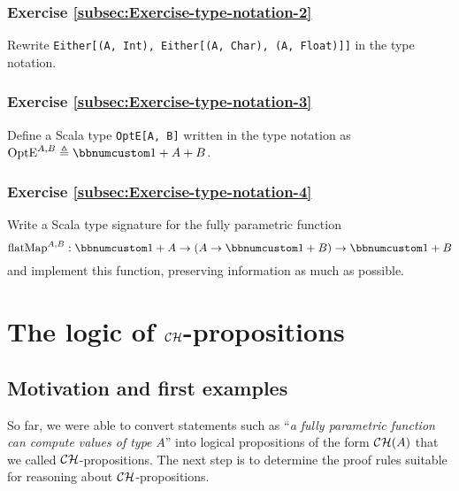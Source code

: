 \subsubsection{Exercise \label{subsec:Exercise-type-notation-2}\ref{subsec:Exercise-type-notation-2}}

Rewrite \lstinline!Either[(A, Int), Either[(A, Char), (A, Float)]]!
in the type notation.

\subsubsection{Exercise \label{subsec:Exercise-type-notation-3}\ref{subsec:Exercise-type-notation-3}}

Define a Scala type \lstinline!OptE[A, B]! written in the type notation
as $\text{OptE}^{A,B}\triangleq\bbnum 1+A+B$.

\subsubsection{Exercise \label{subsec:Exercise-type-notation-4}\ref{subsec:Exercise-type-notation-4}}

Write a Scala type signature for the fully parametric function 
\[
\text{flatMap}^{A,B}:\bbnum 1+A\rightarrow\left(A\rightarrow\bbnum 1+B\right)\rightarrow\bbnum 1+B
\]
and implement this function, preserving information as much as possible.

\section{The logic of ${\cal CH}$-propositions}

\subsection{Motivation and first examples\label{subsec:ch-Motivation-and-first-examples}}

So far, we were able to convert statements such as ``\emph{a fully
parametric function can compute values of type} $A$'' into logical
propositions of the form ${\cal CH}(A)$ that we called ${\cal CH}$-propositions.
The next step is to determine the proof rules suitable for reasoning
about ${\cal CH}$-propositions.

